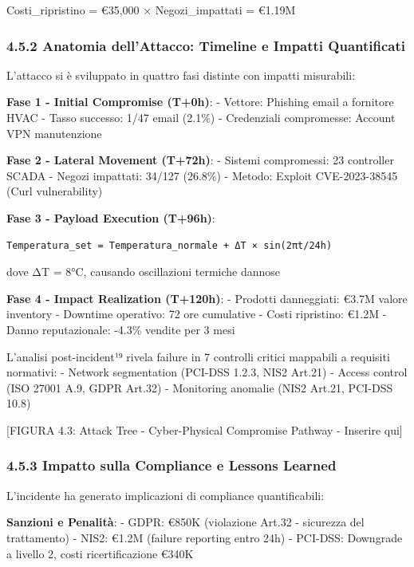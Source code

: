 \documentclass{report}
\begin{document}
Costi\_ripristino = €35,000 × Negozi\_impattati = €1.19M

\subsubsection{4.5.2 Anatomia dell'Attacco: Timeline e Impatti
Quantificati}\label{anatomia-dellattacco-timeline-e-impatti-quantificati}

L'attacco si è sviluppato in quattro fasi distinte con impatti
misurabili:

\textbf{Fase 1 - Initial Compromise (T+0h)}: - Vettore: Phishing email a
fornitore HVAC - Tasso successo: 1/47 email (2.1\%) - Credenziali
compromesse: Account VPN manutenzione

\textbf{Fase 2 - Lateral Movement (T+72h)}: - Sistemi compromessi: 23
controller SCADA - Negozi impattati: 34/127 (26.8\%) - Metodo: Exploit
CVE-2023-38545 (Curl vulnerability)

\textbf{Fase 3 - Payload Execution (T+96h)}:

\begin{verbatim}
Temperatura_set = Temperatura_normale + ΔT × sin(2πt/24h)
\end{verbatim}

dove ΔT = 8°C, causando oscillazioni termiche dannose

\textbf{Fase 4 - Impact Realization (T+120h)}: - Prodotti danneggiati:
€3.7M valore inventory - Downtime operativo: 72 ore cumulative - Costi
ripristino: €1.2M - Danno reputazionale: -4.3\% vendite per 3 mesi

L'analisi post-incident¹⁹ rivela failure in 7 controlli critici
mappabili a requisiti normativi: - Network segmentation (PCI-DSS 1.2.3,
NIS2 Art.21) - Access control (ISO 27001 A.9, GDPR Art.32) - Monitoring
anomalie (NIS2 Art.21, PCI-DSS 10.8)

{[}FIGURA 4.3: Attack Tree - Cyber-Physical Compromise Pathway -
Inserire qui{]}

\subsubsection{4.5.3 Impatto sulla Compliance e Lessons
Learned}\label{impatto-sulla-compliance-e-lessons-learned}

L'incidente ha generato implicazioni di compliance quantificabili:

\textbf{Sanzioni e Penalità}: - GDPR: €850K (violazione Art.32 -
sicurezza del trattamento) - NIS2: €1.2M (failure reporting entro 24h) -
PCI-DSS: Downgrade a livello 2, costi ricertificazione €340K
\end{document}
